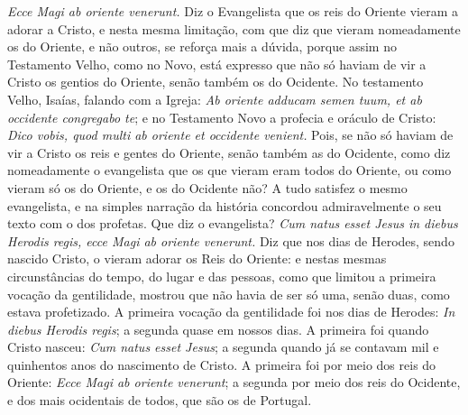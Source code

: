 \emph{Ecce Magi ab oriente venerunt.} Diz o Evangelista que os reis do
Oriente vieram a adorar a Cristo, e nesta mesma limitação, com que diz
que vieram nomeadamente os do Oriente, e não outros, se reforça mais a
dúvida, porque assim no Testamento Velho, como no Novo, está expresso
que não só haviam de vir a Cristo os gentios do Oriente, senão também os
do Ocidente. No testamento Velho, Isaías, falando com a Igreja: \emph{Ab
oriente adducam semen tuum, et ab occidente congregabo te};
e no Testamento Novo a profecia e oráculo de Cristo:
\emph{Dico vobis, quod multi ab oriente et occidente venient.} Pois,
se não só haviam de vir a Cristo os reis e gentes do Oriente, senão
também as do Ocidente, como diz nomeadamente o evangelista que os que
vieram eram todos do Oriente, ou como vieram só os do Oriente, e os do
Ocidente não? A tudo satisfez o mesmo evangelista, e na simples narração
da história concordou admiravelmente o seu texto com o dos profetas. Que
diz o evangelista? \emph{Cum natus esset Jesus in diebus Herodis regis,
ecce Magi ab oriente venerunt.} Diz que nos dias de Herodes, sendo
nascido Cristo, o vieram adorar os Reis do Oriente: e nestas mesmas
circunstâncias do tempo, do lugar e das pessoas, como que limitou a
primeira vocação da gentilidade, mostrou que não havia de ser só uma,
senão duas, como estava profetizado. A primeira vocação da gentilidade
foi nos dias de Herodes: \emph{In diebus Herodis regis}; a segunda
quase em nossos dias. A primeira foi quando Cristo nasceu: \emph{Cum
natus esset Jesus}; a segunda quando já se contavam mil e quinhentos
anos do nascimento de Cristo. A primeira foi por meio dos reis do
Oriente: \emph{Ecce Magi ab oriente venerunt}; a segunda por meio dos
reis do Ocidente, e dos mais ocidentais de todos, que são os de
Portugal.

